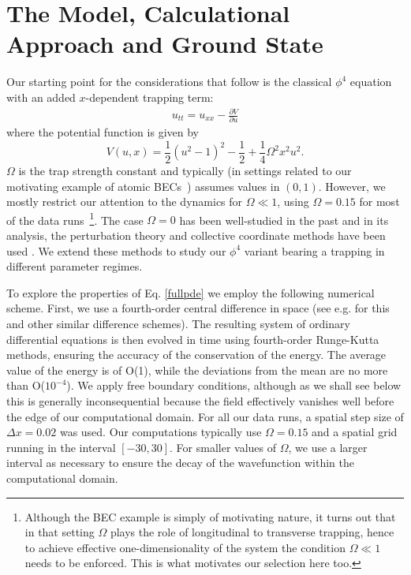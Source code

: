 \documentclass[vecphys]{svmult}		%
\begin{document}
\section{The Model, Calculational Approach and Ground State}
Our starting point for the considerations that follow is
the classical $\phi^4$ equation with an added $x$-dependent trapping term: %
\begin{align}
	u_{tt} = u_{xx}-{\frac{\partial V}{\partial u}}
	\label{fullpde}
	\end{align}
	where the potential function is given by
	\begin{equation}
	{V(u,x)}=\frac{1}{2}(u^2-1)^2-\frac{1}{2}+\frac{1}{4}\Omega^2 x^2 u^2.
	\end{equation}	
$\Omega$ is the trap strength constant and typically (in settings
related to our motivating example of atomic
BECs~\cite{pethick,stringari,darkbook}) assumes values in $(0,1)$. However, we mostly restrict our attention to the dynamics for $\Omega\ll 1$, using $\Omega=0.15$ for most of the data runs~\footnote{Although the BEC example
is simply of motivating nature, it turns out that in that setting
$\Omega$ plays the role of longitudinal to transverse trapping, hence
to achieve effective one-dimensionality of the system the condition
$\Omega \ll 1$ needs to be enforced. This is what motivates our
selection here too.}. The case $\Omega= 0$ has been well-studied in the past and in its analysis, the perturbation theory and collective coordinate methods have been used \cite{anninos,belova,campbell,sugiyama,weigel}.  We extend these methods to study our $\phi^4$ variant bearing a trapping in different parameter regimes.


To explore the properties of Eq. \eqref{fullpde} we employ the following 
numerical scheme. First, we use a fourth-order central difference in space (see e.g. \cite{anninos,roy} for this and other similar difference schemes).
The resulting system of ordinary differential equations is then evolved
in time using fourth-order Runge-Kutta methods, ensuring the
accuracy of the conservation of the energy.
 {The average value of the energy is of O(1), while the deviations from the mean are no more than  O($10^{-4}$). }
We apply  free boundary conditions, although as we shall see below this is generally
inconsequential because the field effectively
vanishes well before the edge of our computational domain.
For all our data runs, a spatial step size of $\Delta x = 0.02$ was used.
Our computations typically use  $\Omega = 0.15$
and a spatial grid running in the interval $[-30, 30]$.
For smaller values of $\Omega$, we use a larger interval as necessary
 to ensure the decay of the wavefunction within the computational
domain.
\end{document}
